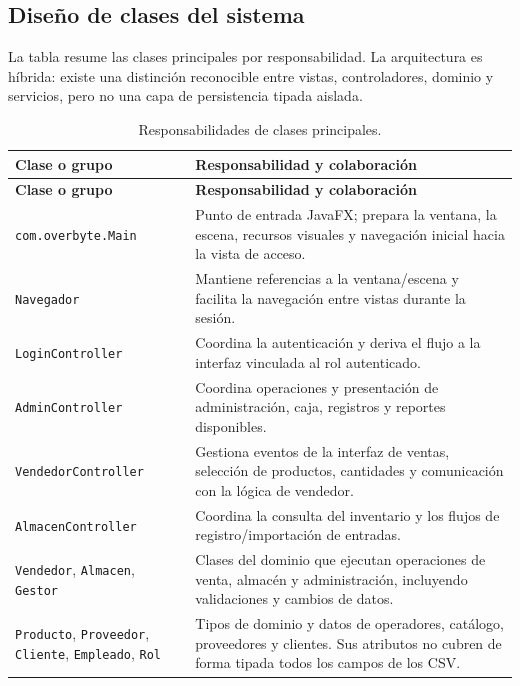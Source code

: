 \subsection{Diseño de clases del sistema}
\label{subsec:clases}

La tabla resume las clases principales por responsabilidad. La arquitectura es híbrida: existe una distinción reconocible entre vistas, controladores, dominio y servicios, pero no una capa de persistencia tipada aislada.

\begin{longtable}{|p{3.1cm}|p{9.3cm}|}
\caption{Responsabilidades de clases principales.}
\label{tab:clases-principales}\\
\hline
\textbf{Clase o grupo} & \textbf{Responsabilidad y colaboración}\\
\hline
\endfirsthead
\hline
\textbf{Clase o grupo} & \textbf{Responsabilidad y colaboración}\\
\hline
\endhead
\texttt{com.overbyte.}\newline\texttt{Main} & Punto de entrada JavaFX; prepara la ventana, la escena, recursos visuales y navegación inicial hacia la vista de acceso.\\
\hline
\texttt{Navegador} & Mantiene referencias a la ventana/escena y facilita la navegación entre vistas durante la sesión.\\
\hline
\scriptsize\texttt{LoginController} & Coordina la autenticación y deriva el flujo a la interfaz vinculada al rol autenticado.\\
\hline
\scriptsize\texttt{AdminController} & Coordina operaciones y presentación de administración, caja, registros y reportes disponibles.\\
\hline
\scriptsize\texttt{VendedorController} & Gestiona eventos de la interfaz de ventas, selección de productos, cantidades y comunicación con la lógica de vendedor.\\
\hline
\scriptsize\texttt{AlmacenController} & Coordina la consulta del inventario y los flujos de registro/importación de entradas.\\
\hline
\scriptsize\texttt{Vendedor}, \texttt{Almacen}, \texttt{Gestor} & Clases del dominio que ejecutan operaciones de venta, almacén y administración, incluyendo validaciones y cambios de datos.\\
\hline
\scriptsize\texttt{Producto}, \texttt{Proveedor}, \texttt{Cliente}, \texttt{Empleado}, \texttt{Rol} & Tipos de dominio y datos de operadores, catálogo, proveedores y clientes. Sus atributos no cubren de forma tipada todos los campos de los CSV.\\

\end{longtable}

